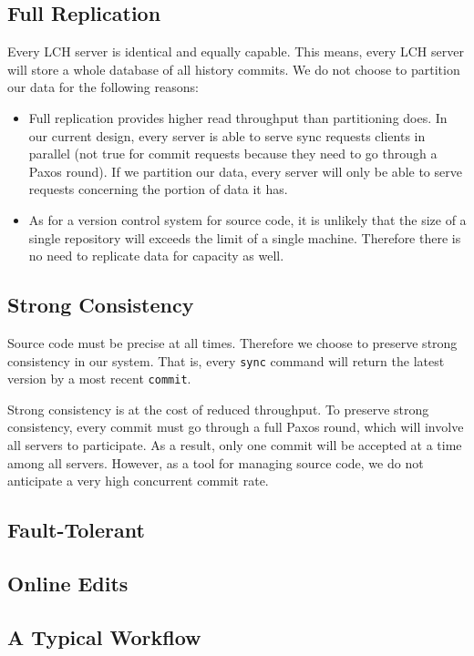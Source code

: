 \documentclass[11pt]{article}
\begin{document}
\subsection{Full Replication}
Every LCH server is identical and equally capable.
This means, every LCH server will store a whole database of all history commits.
We do not choose to partition our data for the following reasons:
\begin{itemize}
    \item Full replication provides higher read throughput than partitioning does.
        In our current design, every server is able to serve sync requests clients in parallel
        (not true for commit requests because they need to go through a Paxos round).
        If we partition our data, every server will only be able to serve requests concerning the portion of data it has.
    \item As for a version control system for source code, it is unlikely that the size of a single repository will exceeds the limit of a single machine.
        Therefore there is no need to replicate data for capacity as well.
\end{itemize}

\subsection{Strong Consistency}
Source code must be precise at all times.
Therefore we choose to preserve strong consistency in our system.
That is, every \texttt{sync} command will return the latest version by a most recent \texttt{commit}.

Strong consistency is at the cost of reduced throughput.
To preserve strong consistency, every commit must go through a full Paxos round, which will involve all servers to participate.
As a result, only one commit will be accepted at a time among all servers.
However, as a tool for managing source code, we do not anticipate a very high concurrent commit rate.

\subsection{Fault-Tolerant}

\subsection{Online Edits}
\subsection{A Typical Workflow}
\end{document}

